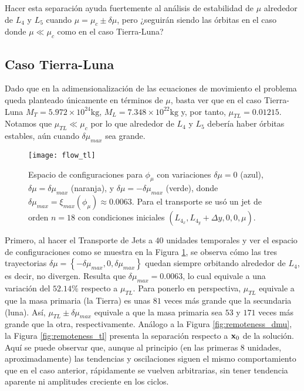 Hacer esta separación ayuda fuertemente al análisis de estabilidad de $\mu$ alrededor de $L_4$ y $L_5$ cuando $\mu = \mu_c \pm \delta\mu$, pero ¿seguirán siendo las órbitas en el caso donde $\mu \ll \mu_c$ como en el caso Tierra-Luna?

\subsection{Caso Tierra-Luna}
Dado que en la adimensionalización de las ecuaciones de movimiento el problema queda planteado únicamente en términos de $\mu$, basta ver que en el caso Tierra-Luna $M_T = 5.972 \times 10^{24} \textrm{kg} $, $M_L = 7.348 \times 10^{22} \textrm{kg}$ y, por tanto, $\mu_{TL} = 0.01215$. Notamos que $\mu_{TL} \ll \mu_c$ por lo que alrededor de $L_4$ y $L_5$ debería haber órbitas estables, aún cuando $\delta\mu_{max}$ sea grande.

\begin{figure}
 \centering
 \texttt{[image: flow\_tl]}
 \caption{Espacio de configuraciones para $\phi_\mu$ con variaciones $\delta\mu = 0$ (azul), $\delta\mu = \delta\mu_{max}$ (naranja), y $\delta\mu = -\delta\mu_{max}$ (verde), donde $\delta\mu_{max} = \xi_{max}(\phi_\mu) \approx 0.0063$. Para el transporte se usó un jet de orden $n=18$ con condiciones iniciales $\left( L_{4_x}, L_{4_y} + \Delta y, 0, 0, \mu \right)$.}
 \label{fig:flow_tl}
\end{figure}

Primero, al hacer el Transporte de Jets a $40$ unidades temporales y ver el espacio de configuraciones como se muestra en la Figura \ref{fig:flow_tl}, se observa cómo las tres trayectorias $\delta\mu = \left\lbrace -\delta\mu_{max}, 0, \delta\mu_{max} \right\rbrace$ quedan siempre orbitando alrededor de $L_4$, es decir, no divergen. Resulta que $\delta\mu_{max} = 0.0063 $, lo cual equivale a una variación del $52.14 \%$ respecto a $\mu_{TL}$. Para ponerlo en perspectiva, $\mu_{TL}$ equivale a que la masa primaria (la Tierra) es unas $81$ veces más grande que la secundaria (luna). Así, $\mu_{TL} \pm \delta\mu_{max}$ equivale a que la masa primaria sea $53$ y $171$ veces más grande que la otra, respectivamente. Análogo a la Figura \ref{fig:remoteness_dmu}, la Figura \ref{fig:remoteness_tl} presenta la separación respecto a $\mathbf{x}_0$ de la solución. Aquí se puede observar que, aunque al principio (en las primeras $8$ unidades, aproximadamente) las tendencias y oscilaciones siguen el mismo comportamiento que en el caso anterior, rápidamente se vuelven arbitrarias, sin tener tendencia aparente ni amplitudes creciente en los ciclos.

